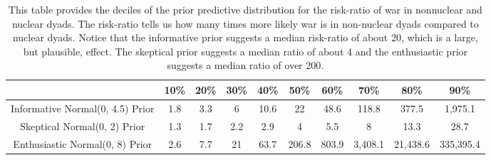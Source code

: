 \begin{table}[H]
\centering
\begingroup\scriptsize
\begin{tabular}{|cccccccccc|}
  \hline
 & 10\% & 20\% & 30\% & 40\% & 50\% & 60\% & 70\% & 80\% & 90\% \\ 
  \hline
Informative Normal(0, 4.5) Prior & 1.8 & 3.3 & 6 & 10.6 & 22 & 48.6 & 118.8 & 377.5 & 1,975.1 \\ 
  Skeptical Normal(0, 2) Prior & 1.3 & 1.7 & 2.2 & 2.9 & 4 & 5.5 & 8 & 13.3 & 28.7 \\ 
  Enthusiastic Normal(0, 8) Prior & 2.6 & 7.7 & 21 & 63.7 & 206.8 & 803.9 & 3,408.1 & 21,438.6 & 335,395.4 \\ 
   \hline
\end{tabular}
\endgroup
\caption{This table provides the deciles of the prior predictive distribution for the 
                  risk-ratio of war in nonnuclear and nuclear dyads. The risk-ratio 
                  tells us how many times more likely war is in non-nuclear dyads compared 
                  to nuclear dyads. Notice that the informative prior suggests a median 
                  risk-ratio of about 20, which is a large, but plausible, effect. The skeptical prior suggests a median 
                  ratio of about 4 and the enthusiastic prior suggests a median ratio of over 
                  200.} 
\label{tab:bm-ppd-deciles}
\end{table}
